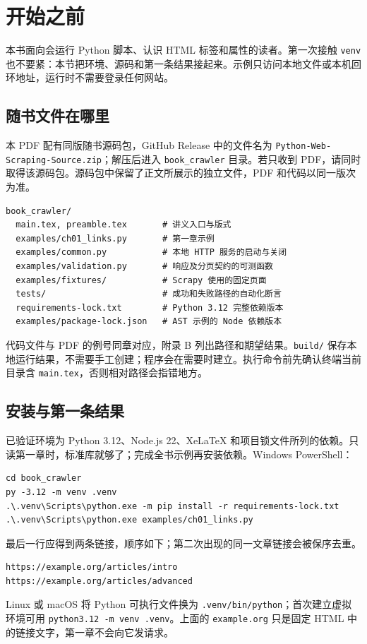 \chapter{开始之前}
本书面向会运行 Python 脚本、认识 HTML 标签和属性的读者。第一次接触 \texttt{venv} 也不要紧：本节把环境、源码和第一条结果接起来。示例只访问本地文件或本机回环地址，运行时不需要登录任何网站。

\section*{随书文件在哪里}
本 PDF 配有同版随书源码包，GitHub Release 中的文件名为 \nolinkurl{Python-Web-Scraping-Source.zip}；解压后进入 \texttt{book\_crawler} 目录。若只收到 PDF，请同时取得该源码包。源码包中保留了正文所展示的独立文件，PDF 和代码以同一版次为准。

\begin{Verbatim}[numbers=none]
book_crawler/
  main.tex, preamble.tex       # 讲义入口与版式
  examples/ch01_links.py       # 第一章示例
  examples/common.py           # 本地 HTTP 服务的启动与关闭
  examples/validation.py       # 响应及分页契约的可测函数
  examples/fixtures/           # Scrapy 使用的固定页面
  tests/                       # 成功和失败路径的自动化断言
  requirements-lock.txt        # Python 3.12 完整依赖版本
  examples/package-lock.json   # AST 示例的 Node 依赖版本
\end{Verbatim}

代码文件与 PDF 的例号同章对应，附录 B 列出路径和期望结果。\texttt{build/} 保存本地运行结果，不需要手工创建；程序会在需要时建立。执行命令前先确认终端当前目录含 \texttt{main.tex}，否则相对路径会指错地方。

\section*{安装与第一条结果}
已验证环境为 Python 3.12、Node.js 22、XeLaTeX 和项目锁文件所列的依赖。只读第一章时，标准库就够了；完成全书示例再安装依赖。Windows PowerShell：
\begin{Verbatim}[numbers=none]
cd book_crawler
py -3.12 -m venv .venv
.\.venv\Scripts\python.exe -m pip install -r requirements-lock.txt
.\.venv\Scripts\python.exe examples/ch01_links.py
\end{Verbatim}
最后一行应得到两条链接，顺序如下；第二次出现的同一文章链接会被保序去重。
\begin{Verbatim}[numbers=none]
https://example.org/articles/intro
https://example.org/articles/advanced
\end{Verbatim}
Linux 或 macOS 将 Python 可执行文件换为 \texttt{.venv/bin/python}；首次建立虚拟环境可用 \texttt{python3.12 -m venv .venv}。上面的 \texttt{example.org} 只是固定 HTML 中的链接文字，第一章不会向它发请求。

